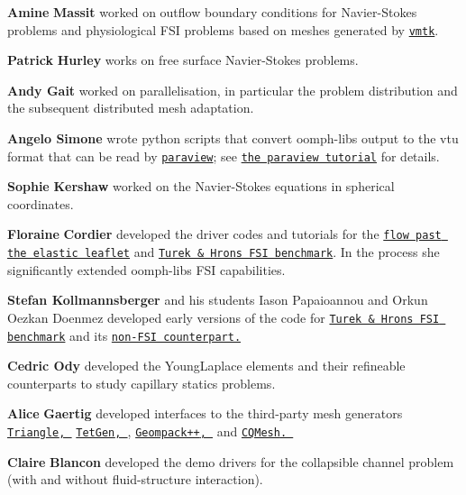 \begin{DoxyItemize}
\item {\bfseries Amine} {\bfseries Massit} worked on outflow boundary conditions for Navier-\/\+Stokes problems and physiological F\+SI problems based on meshes generated by \href{http://www.vmtk.org/}{\tt vmtk}.
\item {\bfseries Patrick} {\bfseries Hurley} works on free surface Navier-\/\+Stokes problems.
\item {\bfseries Andy Gait} worked on parallelisation, in particular the problem distribution and the subsequent distributed mesh adaptation.
\item {\bfseries Angelo Simone} wrote python scripts that convert {\ttfamily oomph-\/lib\textquotesingle{}s} output to the vtu format that can be read by \href{http://www.paraview.org}{\tt paraview}; see \href{../../paraview/html/index.html}{\tt the paraview tutorial} for details.
\item {\bfseries Sophie} {\bfseries Kershaw} worked on the Navier-\/\+Stokes equations in spherical coordinates.
\item {\bfseries Floraine} {\bfseries Cordier} developed the driver codes and tutorials for the \href{../../interaction/fsi_channel_with_leaflet/html/index.html}{\tt flow past the elastic leaflet} and \href{../../interaction/turek_flag/html/index.html}{\tt Turek \& Hron\textquotesingle{}s F\+SI benchmark}. In the process she significantly extended {\ttfamily oomph-\/lib\textquotesingle{}s} F\+SI capabilities.
\item {\bfseries  Stefan Kollmannsberger} and his students Iason Papaioannou and Orkun Oezkan Doenmez developed early versions of the code for \href{../../interaction/turek_flag/html/index.html}{\tt Turek \& Hron\textquotesingle{}s F\+SI benchmark} and its \href{../../navier_stokes/turek_flag_non_fsi/html/index.html}{\tt non-\/\+F\+SI counterpart.}
\item {\bfseries Cedric Ody} developed the {\ttfamily Young\+Laplace} elements and their refineable counterparts to study capillary statics problems.
\item {\bfseries Alice} {\bfseries Gaertig} developed interfaces to the third-\/party mesh generators \href{http://www.cs.cmu.edu/~quake/triangle.html}{\tt {\ttfamily Triangle}, } \href{http://wias-berlin.de/software/tetgen//}{\tt {\ttfamily Tet\+Gen}, }, \href{http://members.shaw.ca/bjoe/}{\tt {\ttfamily Geompack++}, } and \href{http://www.dimap.ufrn.br/~mfsiqueira/Marcelo_Siqueiras_Web_Spot/cqmesh.html}{\tt {\ttfamily C\+Q\+Mesh}. }
\item {\bfseries Claire} {\bfseries Blancon} developed the demo drivers for the collapsible channel problem (with and without fluid-\/structure interaction).

\end{DoxyItemize}
